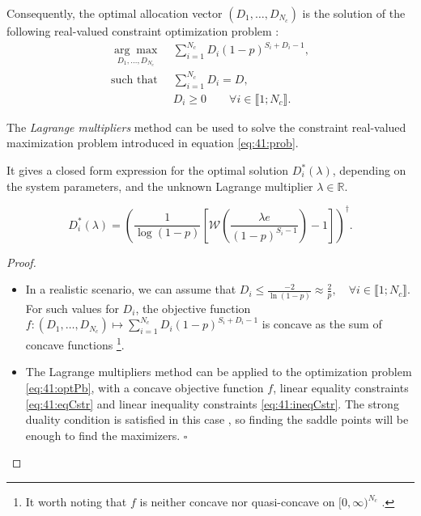 Consequently, the optimal allocation vector $(D_1,\dots,D_{N_c})$ is the solution of the following real-valued constraint optimization problem :
\begin{subequations}
\label{eq:41:prob}
\begin{align}
\underset{D_1,\dots,D_{N_c}}{\arg\max}\; & \sum_{i=1}^{N_c} D_i (1 - p)^{S_i + D_i -1}, \label{eq:41:optPb}\\
\text{such that}\;\; & \sum_{i=1}^{N_c} D_i = D, \label{eq:41:eqCstr}\\
& D_i \geq 0 \qquad \forall i\in\llbracket 1;N_c\rrbracket . \label{eq:41:ineqCstr}
\end{align}
\end{subequations}

\begin{proposition}\label{prop:41:Lagrangian}
The \emph{Lagrange multipliers} method \cite{BoydVanderberghe04} can be used to solve the constraint real-valued maximization problem introduced in equation \eqref{eq:41:prob}.

It gives a closed form expression for the optimal solution $D_i^*(\lambda)$, depending on the system parameters, and the unknown Lagrange multiplier $\lambda \in \mathbb{R}$.

\begin{equation}\label{eq:41:Dilambda}
D_i^*(\lambda) = \left(\frac{1}{\log(1-p)}\left[ \mathcal{W}\left(\frac{\lambda e}{(1-p)^{S_i-1}} \right)-1 \right]\right)^{\dag} .
\end{equation}
\end{proposition}
\begin{proof}
\begin{itemize}
    \item
    In a realistic scenario, we can assume that $D_i\leq \frac{-2}{\ln\left(1-p\right)} \approx \frac{2}{p},\quad \forall i\in\llbracket 1;N_c \rrbracket$. For such values for $D_i$, the objective function $f: (D_1, \dots, D_{N_c}) \mapsto \sum_{i=1}^{N_c} D_i (1 - p)^{S_i + D_i -1}$ is concave as the sum of concave functions
    \footnote{It worth noting that $f$ is neither concave nor quasi-concave on $[0,\infty)^{N_c}$ \cite{Luenberger68,Yaari77}.}.
        \item
The Lagrange multipliers method can be applied to the optimization problem \eqref{eq:41:optPb}, with a concave objective function $f$, linear equality constraints \eqref{eq:41:eqCstr} and linear inequality constraints \eqref{eq:41:ineqCstr}. The strong duality condition is satisfied in this case \cite{BoydVanderberghe04}, so finding the saddle points will be enough to find the maximizers.
    \hfill{}$\square$
    \end{itemize}
\end{proof}

